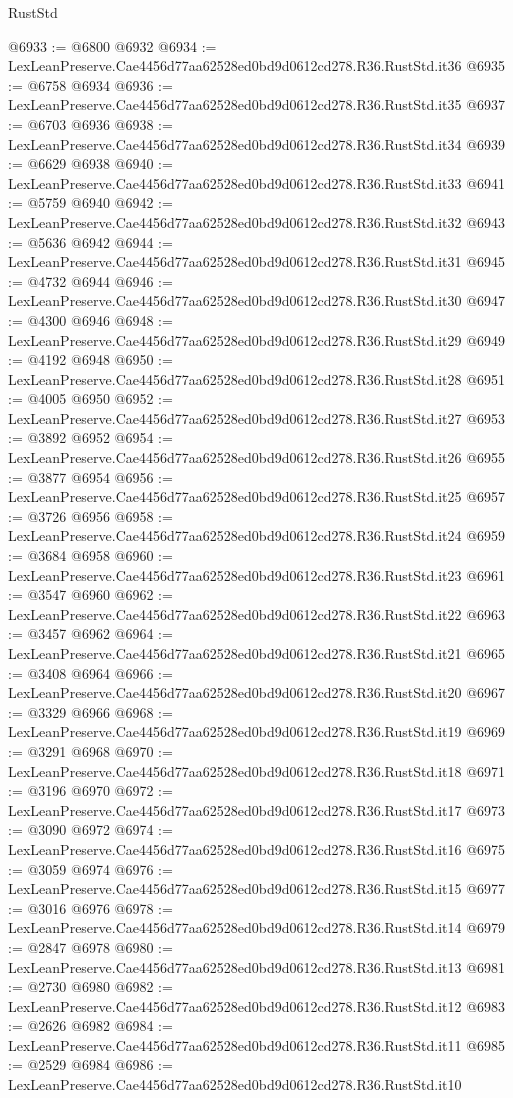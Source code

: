 \begin{lexlean}{RustStd}
\begin{coremodule}
@6933 := @6800 @6932
@6934 := LexLeanPreserve.Cae4456d77aa62528ed0bd9d0612cd278.R36.RustStd.it36
@6935 := @6758 @6934
@6936 := LexLeanPreserve.Cae4456d77aa62528ed0bd9d0612cd278.R36.RustStd.it35
@6937 := @6703 @6936
@6938 := LexLeanPreserve.Cae4456d77aa62528ed0bd9d0612cd278.R36.RustStd.it34
@6939 := @6629 @6938
@6940 := LexLeanPreserve.Cae4456d77aa62528ed0bd9d0612cd278.R36.RustStd.it33
@6941 := @5759 @6940
@6942 := LexLeanPreserve.Cae4456d77aa62528ed0bd9d0612cd278.R36.RustStd.it32
@6943 := @5636 @6942
@6944 := LexLeanPreserve.Cae4456d77aa62528ed0bd9d0612cd278.R36.RustStd.it31
@6945 := @4732 @6944
@6946 := LexLeanPreserve.Cae4456d77aa62528ed0bd9d0612cd278.R36.RustStd.it30
@6947 := @4300 @6946
@6948 := LexLeanPreserve.Cae4456d77aa62528ed0bd9d0612cd278.R36.RustStd.it29
@6949 := @4192 @6948
@6950 := LexLeanPreserve.Cae4456d77aa62528ed0bd9d0612cd278.R36.RustStd.it28
@6951 := @4005 @6950
@6952 := LexLeanPreserve.Cae4456d77aa62528ed0bd9d0612cd278.R36.RustStd.it27
@6953 := @3892 @6952
@6954 := LexLeanPreserve.Cae4456d77aa62528ed0bd9d0612cd278.R36.RustStd.it26
@6955 := @3877 @6954
@6956 := LexLeanPreserve.Cae4456d77aa62528ed0bd9d0612cd278.R36.RustStd.it25
@6957 := @3726 @6956
@6958 := LexLeanPreserve.Cae4456d77aa62528ed0bd9d0612cd278.R36.RustStd.it24
@6959 := @3684 @6958
@6960 := LexLeanPreserve.Cae4456d77aa62528ed0bd9d0612cd278.R36.RustStd.it23
@6961 := @3547 @6960
@6962 := LexLeanPreserve.Cae4456d77aa62528ed0bd9d0612cd278.R36.RustStd.it22
@6963 := @3457 @6962
@6964 := LexLeanPreserve.Cae4456d77aa62528ed0bd9d0612cd278.R36.RustStd.it21
@6965 := @3408 @6964
@6966 := LexLeanPreserve.Cae4456d77aa62528ed0bd9d0612cd278.R36.RustStd.it20
@6967 := @3329 @6966
@6968 := LexLeanPreserve.Cae4456d77aa62528ed0bd9d0612cd278.R36.RustStd.it19
@6969 := @3291 @6968
@6970 := LexLeanPreserve.Cae4456d77aa62528ed0bd9d0612cd278.R36.RustStd.it18
@6971 := @3196 @6970
@6972 := LexLeanPreserve.Cae4456d77aa62528ed0bd9d0612cd278.R36.RustStd.it17
@6973 := @3090 @6972
@6974 := LexLeanPreserve.Cae4456d77aa62528ed0bd9d0612cd278.R36.RustStd.it16
@6975 := @3059 @6974
@6976 := LexLeanPreserve.Cae4456d77aa62528ed0bd9d0612cd278.R36.RustStd.it15
@6977 := @3016 @6976
@6978 := LexLeanPreserve.Cae4456d77aa62528ed0bd9d0612cd278.R36.RustStd.it14
@6979 := @2847 @6978
@6980 := LexLeanPreserve.Cae4456d77aa62528ed0bd9d0612cd278.R36.RustStd.it13
@6981 := @2730 @6980
@6982 := LexLeanPreserve.Cae4456d77aa62528ed0bd9d0612cd278.R36.RustStd.it12
@6983 := @2626 @6982
@6984 := LexLeanPreserve.Cae4456d77aa62528ed0bd9d0612cd278.R36.RustStd.it11
@6985 := @2529 @6984
@6986 := LexLeanPreserve.Cae4456d77aa62528ed0bd9d0612cd278.R36.RustStd.it10

\end{coremodule}
\end{lexlean}
